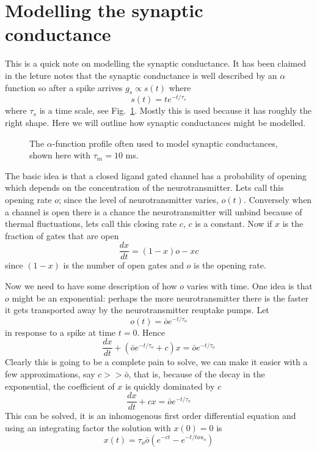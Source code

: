 \documentclass[11pt,a4paper]{scrartcl}
\begin{document}
\section*{Modelling the synaptic conductance}
This is a quick note on modelling the synaptic conductance. It has
been claimed in the leture notes that the synaptic conductance is well
described by an $\alpha$ function so after a spike arrives $g_s\propto
s(t)$ where
\begin{equation}
s(t)=te^{-t/\tau_s}
\end{equation}
where $\tau_s$ is a time scale, see Fig.~\ref{fig:alpha}. Mostly this
is used because it has roughly the right shape. Here we will outline
how synaptic conductances might be modelled.

\begin{figure}
\begin{center}

\end{center}
\caption{The $\alpha$-function profile often used to model synaptic
  conductances, shown here with $\tau_m=10$ ms.\label{fig:alpha}}
\end{figure}

The basic idea is that a closed ligand gated channel has a probability
of opening which depends on the concentration of the
neurotransmitter. Lets call this opening rate $o$; since the level of
neurotransmitter varies, $o(t)$. Conversely when a channel is open
there is a chance the neurotransmitter will unbind because of thermal
fluctuations, lets call this closing rate $c$, $c$ is a constant. Now
if $x$ is the fraction of gates that are open
\begin{equation}
\frac{dx}{dt}=(1-x)o-xc
\end{equation}
since $(1-x)$ is the number of open gates and $o$ is the opening rate.

Now we need to have some description of how $o$ varies with time. One
idea is that $o$ might be an exponential: perhaps the more
neurotransmitter there is the faster it gets transported away by the
neurotransmitter reuptake pumps. Let
\begin{equation}
o(t)=\bar{o}e^{-t/\tau_o}
\end{equation}
in response to a spike at time $t=0$. Hence
\begin{equation}
\frac{dx}{dt}+(\bar{o}e^{-t/\tau_o}+c)x=\bar{o}e^{-t/\tau_o}
\end{equation}
Clearly this is going to be a complete pain to solve, we can make it easier with a few approximations, say $c>>\bar{o}$, that is, because of the decay in the exponential, the coefficient of $x$ is quickly dominated by $c$
\begin{equation}
\frac{dx}{dt}+cx=\bar{o}e^{-t/\tau_o}
\end{equation}
This can be solved, it is an inhomogenous first order differential
equation and using an integrating factor the solution with $x(0)=0$ is
\begin{equation}
x(t)=\tau_o\bar{o}\left(e^{-ct}-e^{-t/tau_o}\right)
\end{equation}
\end{document}
